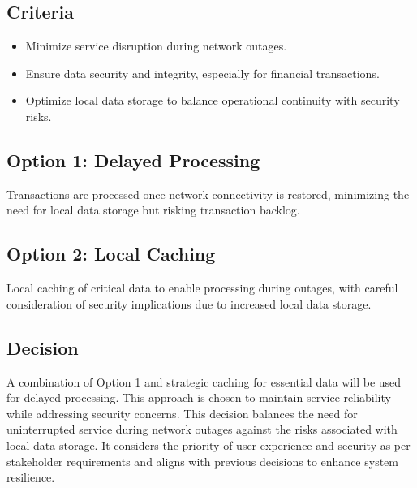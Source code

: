 \subsection*{Criteria}
\begin{itemize}
    \item Minimize service disruption during network outages.
    \item Ensure data security and integrity, especially for financial transactions.
    \item Optimize local data storage to balance operational continuity with security risks.
\end{itemize}

\subsection*{Option 1: Delayed Processing}
Transactions are processed once network connectivity is restored, minimizing the need for local data storage but risking transaction backlog.

\subsection*{Option 2: Local Caching}
Local caching of critical data to enable processing during outages, with careful consideration of security implications due to increased local data storage.

\subsection*{Decision}
A combination of Option 1 and strategic caching for essential data will be used for delayed processing. This approach is chosen to maintain service reliability while addressing security concerns.
This decision balances the need for uninterrupted service during network outages against the risks associated with local data storage. It considers the priority of user experience and security as per stakeholder requirements and aligns with previous decisions to enhance system resilience.

